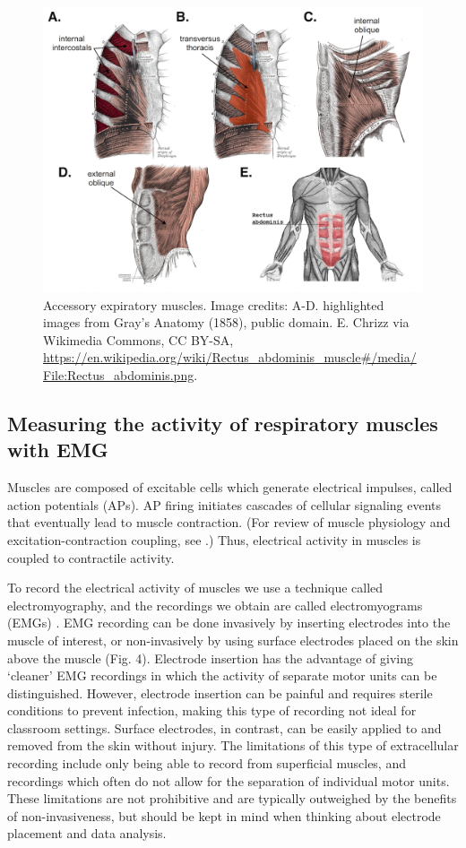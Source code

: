 \documentclass{article}
\begin{document}
\begin{figure}[!htbp]
\centering
\includegraphics[width=0.8\linewidth]{files/EPpXta8zJdzN048lz8AR-439636c465a3dc12e960d366dff1aaa7.png}
\caption[]{Accessory expiratory muscles. Image credits: A-D. highlighted images from Gray's Anatomy (1858), public domain. E. Chrizz via Wikimedia Commons, CC BY-SA, \href{https://en.wikipedia.org/wiki/Rectus\_abdominis\_muscle\#/media/File:Rectus\_abdominis.png}{https://en.wikipedia.org/wiki/Rectus\_abdominis\_muscle\#/media/File:Rectus\_abdominis.png}.}
\label{abF1ZwW96l}
\end{figure}

\subsection{Measuring the activity of respiratory muscles with EMG}

Muscles are composed of excitable cells which generate electrical impulses, called action potentials (APs). AP firing initiates cascades of cellular signaling events that eventually lead to muscle contraction. (For review of muscle physiology and excitation-contraction coupling, see \citet{calderon2014excitation}.) Thus, electrical activity in muscles is coupled to contractile activity.

To record the electrical activity of muscles we use a technique called electromyography, and the recordings we obtain are called electromyograms (EMGs) \citep{garcia2011surface}. EMG recording can be done invasively by inserting electrodes into the muscle of interest, or non-invasively by using surface electrodes placed on the skin above the muscle (Fig. 4). Electrode insertion has the advantage of giving `cleaner' EMG recordings in which the activity of separate motor units can be distinguished. However, electrode insertion can be painful and requires sterile conditions to prevent infection, making this type of recording not ideal for classroom settings. Surface electrodes, in contrast, can be easily applied to and removed from the skin without injury. The limitations of this type of extracellular recording include only being able to record from superficial muscles, and recordings which often do not allow for the separation of individual motor units. These limitations are not prohibitive and are typically outweighed by the benefits of non-invasiveness, but should be kept in mind when thinking about electrode placement and data analysis.
\end{document}
